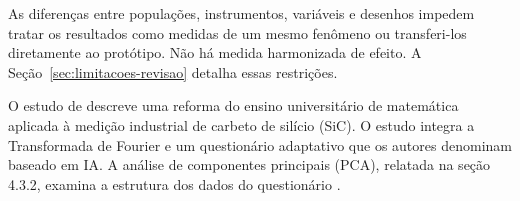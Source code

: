 As diferenças entre populações, instrumentos, variáveis e desenhos impedem tratar os resultados como medidas de um mesmo fenômeno ou transferi-los diretamente ao protótipo. Não há medida harmonizada de efeito. A Seção~\ref{sec:limitacoes-revisao} detalha essas restrições.

O estudo de  descreve uma reforma do ensino universitário de matemática aplicada à medição industrial de carbeto de silício (SiC). O estudo integra a Transformada de Fourier e um questionário adaptativo que os autores denominam baseado em IA. A análise de componentes principais (PCA), relatada na seção 4.3.2, examina a estrutura dos dados do questionário \cite[seção~4.3.2]{UniversityMathematics2026_6919}.

\begingroup
{}

